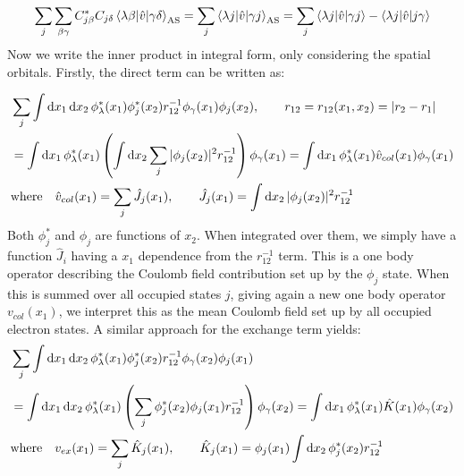 \documentclass{article}
\newcommand{\inner}[3]{\braket{#1|#2|#3}}
\newcommand{\innerAS}[3]{\inner{#1}{#2}{#3}_{\text{AS}}}
\begin{document}
    \begin{align*}
        \sum_j \sum_{\beta\gamma} C^*_{j\beta} C_{j\delta} \innerAS{\lambda\beta}{\hat{v}}{\gamma\delta} = \sum_j \innerAS{\lambda j}{\hat{v}}{\gamma j} = \sum_j \inner{\lambda j}{\hat{v}}{\gamma j} - \inner{\lambda j}{\hat{v}}{j\gamma} 
    \end{align*}
    Now we write the inner product in integral form, only considering the spatial orbitals. Firstly, the direct term can be written as:

    \begin{align}
        &\sum_{j}\int \dd{x_1} \dd{x_2} \phi^*_{\lambda}(x_1) \phi^*_j(x_2) r_{12}^{-1} \phi_\gamma(x_1) \phi_j(x_2), \hspace{20px} r_{12} = r_{12}(x_1, x_2) = |r_2 - r_1| \nonumber \\
        &= \int \dd{x_1} \phi^*_{\lambda}(x_1) \left( \int \dd{x_2} \sum_j |\phi_j(x_2)|^2 r_{12}^{-1}\right)\phi_\gamma(x_1) = \int \dd{x_1} \phi^*_{\lambda}(x_1) \hat{v}_{col}(x_1) \phi_\gamma(x_1) \label{eq:HF_J_spatial}\\
        &\text{where}\hspace{10px} \hat{v}_{col}(x_1) =  \sum_j \hat{J}_j (x_1),\hspace{10px}\hspace{10px} \hat{J}_j(x_1) = \int \dd{x_2} |\phi_j(x_2)|^2 r_{12}^{-1} \nonumber
    \end{align}
    Both $\phi^*_j$ and $\phi_j$ are functions of $x_2$. When integrated over them, we simply have a function $\hat{J}_i$ having a $x_1$ dependence from the $r_{12}^{-1}$ term. This is a one body operator describing the Coulomb field contribution set up by the $\phi_j$ state. When this is summed over all occupied states $j$, giving again a new one body operator $v_{col} (x_1)$, we interpret this as the mean Coulomb field set up by all occupied electron states. A similar approach for the exchange term yields:
    \begin{align}
        &\sum_{j}\int \dd{x_1} \dd{x_2} \phi^*_{\lambda}(x_1) \phi^*_j(x_2) r_{12}^{-1} \phi_\gamma(x_2) \phi_j(x_1) \nonumber\\
        &=\int \dd{x_1} \dd{x_2} \phi^*_{\lambda}(x_1) \left(\sum_{j} \phi^*_j(x_2)\phi_j(x_1)r_{12}^{-1} \right) \phi_\gamma(x_2) = \int \dd{x_1}  \phi^*_{\lambda}(x_1) \hat{K}(x_1) \phi_\gamma(x_2) \label{eq:HF_K_spatial} \\ 
        &\text{where}\hspace{10px} v_{ex}(x_1) =  \sum_j \hat{K}_j (x_1),\hspace{10px}\hspace{10px} \hat{K}_j (x_1) = \phi_j(x_1)\int \dd{x_2} \phi^*_j(x_2)r_{12}^{-1} \nonumber  
    \end{align}
\end{document}
